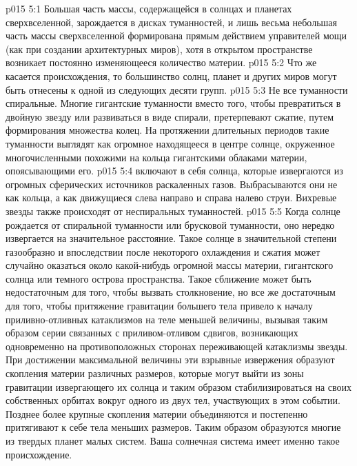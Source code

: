 \vs p015 5:1 Большая часть массы, содержащейся в солнцах и планетах сверхвселенной, зарождается в дисках туманностей, и лишь весьма небольшая часть массы сверхвселенной формирована прямым действием управителей мощи (как при создании архитектурных миров), хотя в открытом пространстве возникает постоянно изменяющееся количество материи.
\vs p015 5:2 Что же касается происхождения, то большинство солнц, планет и других миров могут быть отнесены к одной из следующих десяти групп.
\vs p015 5:3 \pc {}\bibnobreakspace {} Не все туманности спиральные. Многие гигантские туманности вместо того, чтобы превратиться в двойную звезду или развиваться в виде спирали, претерпевают сжатие, путем формирования множества колец. На протяжении длительных периодов такие туманности выглядят как огромное находящееся в центре солнце, окруженное многочисленными похожими на кольца гигантскими облаками материи, опоясывающими его.
\vs p015 5:4 \pc {}\bibnobreakspace {} включают в себя солнца, которые извергаются из огромных сферических источников раскаленных газов. Выбрасываются они не как кольца, а как движущиеся слева направо и справа налево струи. Вихревые звезды также происходят от неспиральных туманностей.
\vs p015 5:5 \pc {}\bibnobreakspace {} Когда солнце рождается от спиральной туманности или брусковой туманности, оно нередко извергается на значительное расстояние. Такое солнце в значительной степени газообразно и впоследствии после некоторого охлаждения и сжатия может случайно оказаться около какой\hyp{}нибудь огромной массы материи, гигантского солнца или темного острова пространства. Такое сближение может быть недостаточным для того, чтобы вызвать столкновение, но все же достаточным для того, чтобы притяжение гравитации большего тела привело к началу приливно\hyp{}отливных катаклизмов на теле меньшей величины, вызывая таким образом серии связанных с приливом\hyp{}отливом сдвигов, возникающих одновременно на противоположных сторонах переживающей катаклизмы звезды. При достижении максимальной величины эти взрывные извержения образуют скопления материи различных размеров, которые могут выйти из зоны гравитации извергающего их солнца и таким образом стабилизироваться на своих собственных орбитах вокруг одного из двух тел, участвующих в этом событии. Позднее более крупные скопления материи объединяются и постепенно притягивают к себе тела меньших размеров. Таким образом образуются многие из твердых планет малых систем. Ваша солнечная система имеет именно такое происхождение.
